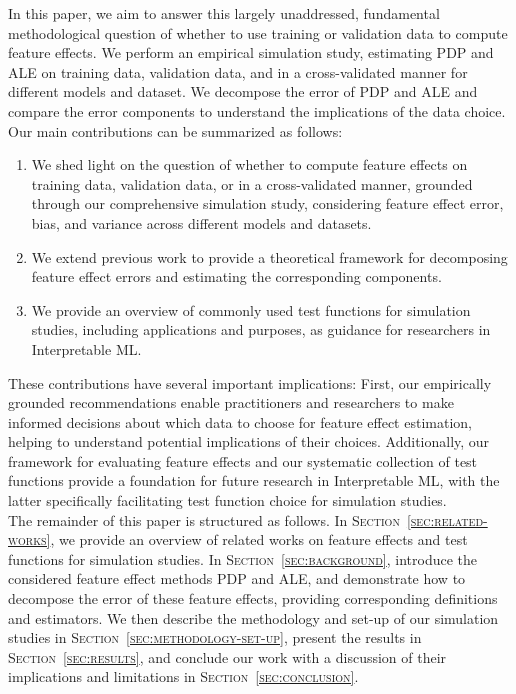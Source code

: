 \documentclass[runningheads]{llncs}
\begin{document}
\noindent In this paper, we aim to answer this largely unaddressed, fundamental
methodological question of whether to use training or validation data to
compute feature effects. We perform an empirical simulation study, estimating
PDP and ALE on training data, validation data, and in a cross-validated manner
for different models and dataset. We decompose the error of PDP and ALE and
compare the error components to understand the implications of the data choice.
Our main contributions can be summarized as follows:

\begin{enumerate}
    \item We shed light on the question of whether to compute feature effects on training
          data, validation data, or in a cross-validated manner, grounded through our
          comprehensive simulation study, considering feature effect error, bias, and
          variance across different models and datasets.
    \item We extend previous work to provide a theoretical framework for decomposing
          feature effect errors and estimating the corresponding components.
    \item We provide an overview of commonly used test functions for simulation studies,
          including applications and purposes, as guidance for researchers in
          Interpretable ML. %
\end{enumerate}

\noindent These contributions have several important implications: First, our empirically
grounded recommendations enable practitioners and researchers to make informed
decisions about which data to choose for feature effect estimation, helping to
understand potential implications of their choices. Additionally, our framework
for evaluating feature effects and our systematic collection of test functions
provide a foundation for future research in Interpretable ML, with the latter
specifically facilitating test function choice for simulation studies.\\

\noindent The remainder of this paper is structured as follows. In
\textsc{Section~\ref{sec:related-works}}, we provide an overview of related
works on feature effects and test functions for simulation studies. In
\textsc{Section~\ref{sec:background}}, introduce the considered feature
effect methods PDP and ALE, and demonstrate how to decompose the error of these
feature effects, providing corresponding definitions and estimators.
We then describe the methodology and set-up of our simulation studies in
\textsc{Section~\ref{sec:methodology-set-up}}, present the results in
\textsc{Section~\ref{sec:results}}, and conclude our work with a discussion
of their implications and limitations in \textsc{Section~\ref{sec:conclusion}}.
\end{document}
